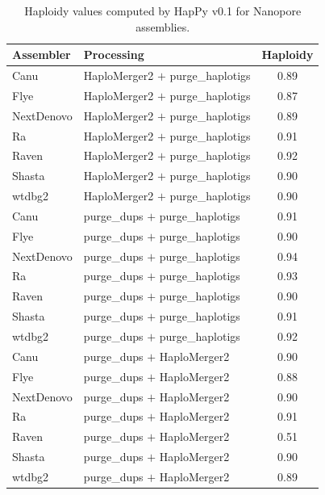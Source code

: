 \begin{table}[ht]
\centering
\caption{Haploidy values computed by HapPy v0.1 for Nanopore assemblies.}
\begin{tabular}{llc}
\hline
\textbf{Assembler} & \textbf{Processing} & \textbf{Haploidy} \\
\hline
Canu & HaploMerger2 $+$ purge\_haplotigs & 0.89 \\
Flye & HaploMerger2 $+$ purge\_haplotigs & 0.87 \\
NextDenovo & HaploMerger2 $+$ purge\_haplotigs & 0.89 \\
Ra & HaploMerger2 $+$ purge\_haplotigs & 0.91 \\
Raven & HaploMerger2 $+$ purge\_haplotigs & 0.92 \\
Shasta & HaploMerger2 $+$ purge\_haplotigs & 0.90 \\
wtdbg2 & HaploMerger2 $+$ purge\_haplotigs & 0.90 \\
Canu & purge\_dups $+$ purge\_haplotigs & 0.91 \\
Flye & purge\_dups $+$ purge\_haplotigs & 0.90 \\
NextDenovo & purge\_dups $+$ purge\_haplotigs & 0.94 \\
Ra & purge\_dups $+$ purge\_haplotigs & 0.93 \\
Raven & purge\_dups $+$ purge\_haplotigs & 0.90 \\
Shasta & purge\_dups $+$ purge\_haplotigs & 0.91 \\
wtdbg2 & purge\_dups $+$ purge\_haplotigs & 0.92 \\
Canu & purge\_dups $+$ HaploMerger2 & 0.90 \\
Flye & purge\_dups $+$ HaploMerger2 & 0.88 \\
NextDenovo & purge\_dups $+$ HaploMerger2 & 0.90 \\
Ra & purge\_dups $+$ HaploMerger2 & 0.91 \\
Raven & purge\_dups $+$ HaploMerger2 & 0.51 \\
Shasta & purge\_dups $+$ HaploMerger2 & 0.90 \\
wtdbg2 & purge\_dups $+$ HaploMerger2 & 0.89 \\
\hline
\end{tabular}
\label{tab:nanopore_happy_part3}
\end{table}

